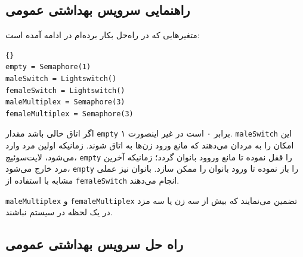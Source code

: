 \documentclass{book}
\newcommand{\clearemptydoublepage}{\newpage\cleardoublepage}
\begin{document}

\clearemptydoublepage
\subsection{راهنمایی سرویس بهداشتی عمومی}

    متغیرهایی که در راه‌حل بکار برده‌ام در ادامه آمده است:

\begin{latin}
\begin{lstlisting}[title=\rl{راهنمایی سرویس بهداشتی عمومی}]{}
empty = Semaphore(1)
maleSwitch = Lightswitch()
femaleSwitch = Lightswitch()
maleMultiplex = Semaphore(3)
femaleMultiplex = Semaphore(3)
\end{lstlisting}
\end{latin}

     اگر اتاق خالی باشد مقدار {\tt empty} برابر ۰ است در غیر اینصورت ۱. 
    {\tt maleSwitch} 
    این امکان را به مردان می‌دهند که مانع ورود زن‌ها به اتاق شوند. زمانیکه اولین مرد وارد می‌شود، لایت‌سوئیچ، {\tt empty} را قفل نموده تا 
    مانع وروود بانوان گردد؛ زمانیکه آخرین مرد خارج می‌شود، {\tt empty} را باز نموده تا ورود بانوان را ممکن سازد. بانوان نیز 
    عملی مشابه با استفاده از {\tt femaleSwitch} انجام می‌دهند.

    {\tt maleMultiplex} و {\tt femaleMultiplex}  
    تضمین می‌نمایند که بیش از سه زن یا سه مزد در یک لحظه در سیستم نباشند. 


\clearemptydoublepage
\subsection{راه حل سرویس بهداشتی عمومی}
\end{document}
